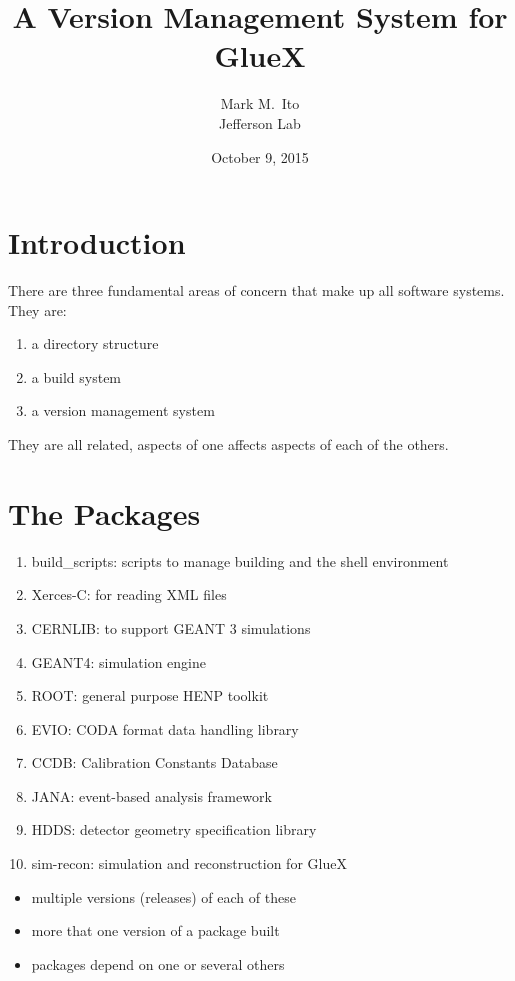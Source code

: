 \documentclass[12pt]{article}
\title{A Version Management System for GlueX}
\author{Mark M.\ Ito \\ \medskip Jefferson Lab}
\date{October 9, 2015}
\begin{document}
\maketitle

\section{Introduction}
There are three fundamental areas of concern that make up all software
systems. They are:

\begin{enumerate}
\item a directory structure
\item a build system
\item a version management system
\end{enumerate}

They are all related, aspects of one affects aspects of each of the others.

\section{The Packages}

\begin{enumerate}
\item build\_scripts: scripts to manage building and the shell environment
\item Xerces-C: for reading XML files
\item CERNLIB: to support GEANT 3 simulations
\item GEANT4: simulation engine
\item ROOT: general purpose HENP toolkit
\item EVIO: CODA format data handling library
\item CCDB: Calibration Constants Database
\item JANA: event-based analysis framework
\item HDDS: detector geometry specification library 
\item sim-recon: simulation and reconstruction for GlueX
\end{enumerate}

\begin{itemize}
\item multiple versions (releases) of each of these
\item more that one version of a package built
\item packages depend on one or several others
\end{itemize}
\end{document}
